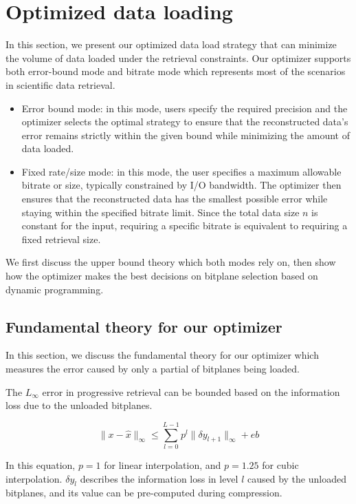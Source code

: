 \section{Optimized data loading} 
\label{sec:optimizer}
In this section, we present our optimized data load strategy that can minimize the volume of data loaded under the retrieval constraints.
Our optimizer supports both error-bound mode and bitrate mode which represents most of the scenarios in scientific data retrieval.
\begin{itemize}
    \item Error bound mode: in this mode, users specify the required precision and the optimizer selects the optimal strategy to ensure that the reconstructed data's error remains strictly within the given bound while minimizing the amount of data loaded.
    
    \item Fixed rate/size mode: in this mode, the user specifies a maximum allowable bitrate or size, typically constrained by I/O bandwidth. The optimizer then ensures that the reconstructed data has the smallest possible error while staying within the specified bitrate limit. Since the total data size $n$ is constant for the input, requiring a specific bitrate is equivalent to requiring a fixed retrieval size.
\end{itemize}
We first discuss the upper bound theory which both modes rely on, then show how the optimizer makes the best decisions on bitplane selection based on dynamic programming.


\subsection{Fundamental theory for our optimizer}
\label{sec: optimized-base-theory}
In this section, we discuss the fundamental theory for our optimizer which measures the error caused by only a partial of bitplanes being loaded.

\begin{theorem}
The $L_\infty$ error in progressive retrieval can be bounded based on the information loss due to the unloaded bitplanes.

\begin{equation}
\|x-\hat x\|_\infty \leq \sum_{l = 0}^{L-1} p^{l}\|\delta y_{l+1}\|_\infty + eb
\label{eq:upperbound_1}
\end{equation}

In this equation, $p=1$ for linear interpolation, and $p=1.25$ for cubic interpolation. $\delta y_l$ describes the information loss in level $l$ caused by the unloaded bitplanes, and its value can be pre-computed during compression.

\end{theorem}

